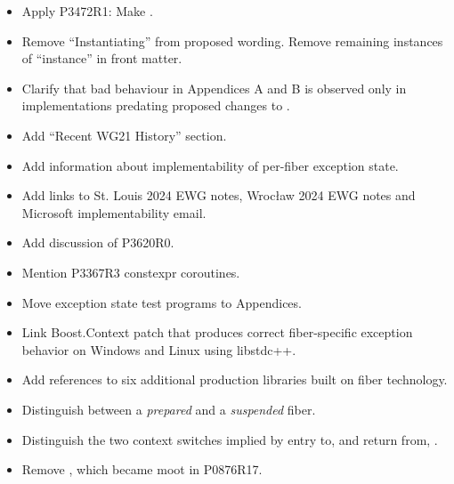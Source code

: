 
\begin{itemize}
    \item Apply P3472R1: Make \fiber\cpp{::}\canresume {}.
    \item Remove ``Instantiating'' from proposed wording. Remove remaining
          instances of ``instance'' in front matter.
    \item Clarify that bad behaviour in Appendices A and B is observed only in
          implementations predating proposed changes to .
    \item Add ``Recent WG21 History'' section.
\end{itemize}


\begin{itemize}
    \item Add information about implementability of per-fiber exception state.
    \item Add links to St. Louis 2024 EWG notes, Wrocław 2024 EWG notes and
          Microsoft implementability email.
    \item Add discussion of P3620R0.
    \item Mention P3367R3 constexpr coroutines.
\end{itemize}


\begin{itemize}
    \item Move exception state test programs to Appendices.
    \item Link Boost.Context patch that produces correct fiber-specific
          exception behavior on Windows and Linux using libstdc++.
    \item Add references to six additional production libraries built on fiber
          technology.
\end{itemize}


\begin{itemize}
    \item Distinguish between a \emph{prepared} and a \emph{suspended} fiber.
    \item Distinguish the two context switches implied by entry to, and return
          from, \resumewith.
    \item Remove , which became moot
          in P0876R17.
\end{itemize}

